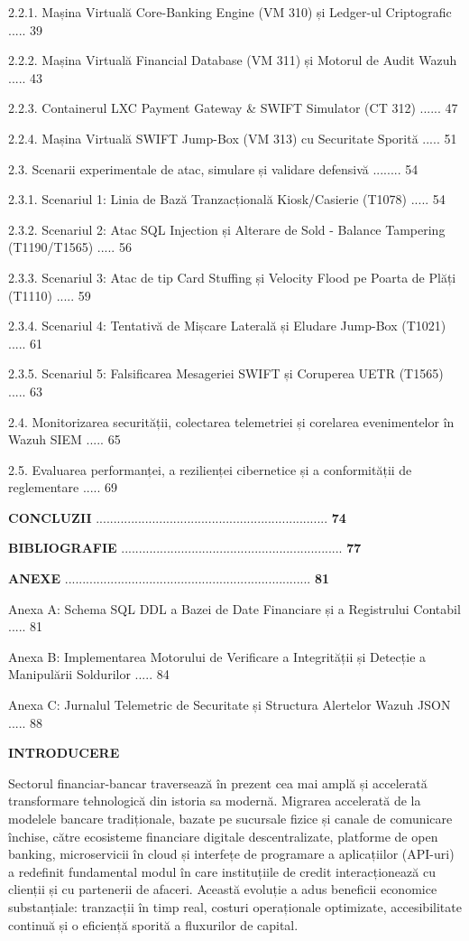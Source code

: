 \documentclass[
]{article}
\begin{document}
2.2.1. Mașina Virtuală Core-Banking Engine (VM 310) și Ledger-ul
Criptografic ..... 39

2.2.2. Mașina Virtuală Financial Database (VM 311) și Motorul de Audit
Wazuh ..... 43

2.2.3. Containerul LXC Payment Gateway \& SWIFT Simulator (CT 312)
...... 47

2.2.4. Mașina Virtuală SWIFT Jump-Box (VM 313) cu Securitate Sporită
..... 51

2.3. Scenarii experimentale de atac, simulare și validare defensivă
........ 54

2.3.1. Scenariul 1: Linia de Bază Tranzacțională Kiosk/Casierie (T1078)
..... 54

2.3.2. Scenariul 2: Atac SQL Injection și Alterare de Sold - Balance
Tampering (T1190/T1565) ..... 56

2.3.3. Scenariul 3: Atac de tip Card Stuffing și Velocity Flood pe
Poarta de Plăți (T1110) ..... 59

2.3.4. Scenariul 4: Tentativă de Mișcare Laterală și Eludare Jump-Box
(T1021) ..... 61

2.3.5. Scenariul 5: Falsificarea Mesageriei SWIFT și Coruperea UETR
(T1565) ..... 63

2.4. Monitorizarea securității, colectarea telemetriei și corelarea
evenimentelor în Wazuh SIEM ..... 65

2.5. Evaluarea performanței, a rezilienței cibernetice și a
conformității de reglementare ..... 69

\textbf{CONCLUZII}
..................................................................
\textbf{74}

\textbf{BIBLIOGRAFIE}
...............................................................
\textbf{77}

\textbf{ANEXE}
......................................................................
\textbf{81}

Anexa A: Schema SQL DDL a Bazei de Date Financiare și a Registrului
Contabil ..... 81

Anexa B: Implementarea Motorului de Verificare a Integrității și
Detecție a Manipulării Soldurilor ..... 84

Anexa C: Jurnalul Telemetric de Securitate și Structura Alertelor Wazuh
JSON ..... 88

\textbf{INTRODUCERE}

Sectorul financiar-bancar traversează în prezent cea mai amplă și
accelerată transformare tehnologică din istoria sa modernă. Migrarea
accelerată de la modelele bancare tradiționale, bazate pe sucursale
fizice și canale de comunicare închise, către ecosisteme financiare
digitale descentralizate, platforme de open banking, microservicii în
cloud și interfețe de programare a aplicațiilor (API-uri) a redefinit
fundamental modul în care instituțiile de credit interacționează cu
clienții și cu partenerii de afaceri. Această evoluție a adus beneficii
economice substanțiale: tranzacții în timp real, costuri operaționale
optimizate, accesibilitate continuă și o eficiență sporită a fluxurilor
de capital.
\end{document}
